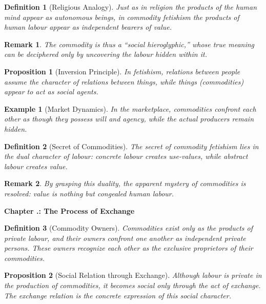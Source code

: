 \documentclass{article}
\newcommand{\chapterfont}{\fontsize{16pt}{18pt}\bfseries}
\newcounter{volume}
\renewcommand{\thevolume}{\Roman{volume}}
\newcounter{chapter}[volume]
\renewcommand{\thechapter}{\thevolume.\arabic{chapter}}
\newcommand{\chapter}[1]{%
  \refstepcounter{chapter}%
  \vspace{2ex}%
  {\chapterfont Chapter \thechapter: #1\par}%
  \vspace{2ex}%
}
\newtheorem{innerdef}{Definition}
\newtheorem{innerprop}{Proposition}
\newtheorem{innerex}{Example}
\newtheorem{innerremark}{Remark}
\newenvironment{definition}{\begin{innerdef}}{\end{innerdef}}
\newenvironment{proposition}{\begin{innerprop}}{\end{innerprop}}
\newenvironment{example}{\begin{innerex}}{\end{innerex}}
\newenvironment{remark}{\begin{innerremark}}{\end{innerremark}}
\begin{document}
\begin{definition}[Religious Analogy]
Just as in religion the products of the human mind appear as autonomous 
beings, in commodity fetishism the products of human labour appear as 
independent bearers of value.
\end{definition}

\begin{remark}
The commodity is thus a “social hieroglyphic,” whose true meaning can be 
deciphered only by uncovering the labour hidden within it.
\end{remark}

\begin{proposition}[Inversion Principle]
In fetishism, relations between people assume the character of relations 
between things, while things (commodities) appear to act as social agents.
\end{proposition}

\begin{example}[Market Dynamics]
In the marketplace, commodities confront each other as though they 
possess will and agency, while the actual producers remain hidden.
\end{example}

\begin{definition}[Secret of Commodities]
The secret of commodity fetishism lies in the dual character of labour: 
concrete labour creates use-values, while abstract labour creates value.
\end{definition}

\begin{remark}
By grasping this duality, the apparent mystery of commodities is resolved: 
value is nothing but congealed human labour.
\end{remark}

\chapter{The Process of Exchange} %

\begin{definition}[Commodity Owners]
Commodities exist only as the products of private labour, and 
their owners confront one another as independent private persons. 
These owners recognize each other as the exclusive proprietors of 
their commodities.
\end{definition}

\begin{proposition}[Social Relation through Exchange]
Although labour is private in the production of commodities, 
it becomes social only through the act of exchange. 
The exchange relation is the concrete expression of 
this social character.
\end{proposition}
\end{document}
